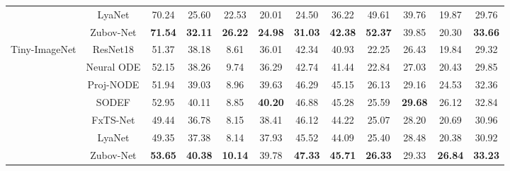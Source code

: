 \documentclass[journal]{IEEEtran}
\begin{document}
\begin{table}[ht]
\begin{tabular}{cccccccccccc}
		& LyaNet          & 70.24            & 25.60             & 22.53          & 20.01          & 24.50            & 36.22            & 49.61           & 39.76               & 19.87             & 29.76        \\
		& Zubov-Net       & \textbf{71.54}   & \textbf{32.11}    & \textbf{26.22} & \textbf{24.98} & \textbf{31.03}   & \textbf{42.38}   & \textbf{52.37}  & 39.85               & 20.30             & \textbf{33.66}        \\  \midrule
		\multirow{6}{*}{Tiny-ImageNet}  & ResNet18   & 51.37          & 38.18          & 8.61           & 36.01          & 42.34          & 40.93          & 22.25          & 26.43          & 19.84          & 29.32          \\
		& Neural ODE & 52.15          & 38.26          & 9.74           & 36.29          & 42.74          & 41.44          & 22.84          & 27.03          & 20.43          & 29.85          \\
		& Proj-NODE  & 51.94          & 39.03          & 8.96           & 39.63          & 46.29          & 45.15          & 26.13          & 29.16          & 24.53          & 32.36          \\
		& SODEF      & 52.95          & 40.11          & 8.85           & \textbf{40.20} & 46.88          & 45.28          & 25.59          & \textbf{29.68} & 26.12          & 32.84          \\
		& FxTS-Net   & 49.44          & 36.78          & 8.15           & 38.41          & 46.12          & 44.22          & 25.07          & 28.20          & 20.69          & 30.96          \\
		& LyaNet     & 49.35          & 37.38          & 8.14           & 37.93          & 45.52          & 44.09          & 25.40          & 28.48          & 20.38          & 30.92          \\
		& Zubov-Net  & \textbf{53.65} & \textbf{40.38} & \textbf{10.14} & 39.78          & \textbf{47.33} & \textbf{45.71} & \textbf{26.33} & 29.33          & \textbf{26.84} & \textbf{33.23}\\
		\bottomrule
	\end{tabular}
\end{table}
\end{document}
